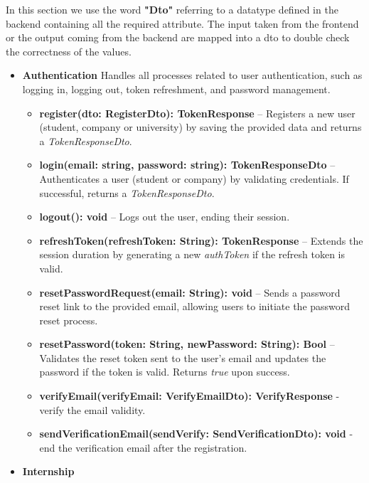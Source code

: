 In this section we use the word \textbf{"Dto"} referring to a datatype defined in the backend containing all the required attribute. The input taken from the frontend or the output coming from the backend are mapped into a dto to double check the correctness of the values.

\begin{itemize}
\item \textbf{Authentication}
Handles all processes related to user authentication, such as logging in, logging out, token refreshment, and password management.

\begin{itemize}
    \item \textbf{register(dto: RegisterDto): TokenResponse} – Registers a new user (student, company or university) by saving the provided data and returns a \textit{TokenResponseDto}.
    \item \textbf{login(email: string, password: string): TokenResponseDto} – Authenticates a user (student or company) by validating credentials. If successful, returns a \textit{TokenResponseDto}.
    \item \textbf{logout(): void} – Logs out the user, ending their session.
    \item \textbf{refreshToken(refreshToken: String): TokenResponse} – Extends the session duration by generating a new \textit{authToken} if the refresh token is valid.
    \item \textbf{resetPasswordRequest(email: String): void} – Sends a password reset link to the provided email, allowing users to initiate the password reset process.
    \item \textbf{resetPassword(token: String, newPassword: String): Bool} – Validates the reset token sent to the user's email and updates the password if the token is valid. Returns \textit{true} upon success.
    \item \textbf{verifyEmail(verifyEmail: VerifyEmailDto): VerifyResponse} - verify the email validity.
    \item \textbf{sendVerificationEmail(sendVerify: SendVerificationDto): void} - end the verification email after the registration.
\end{itemize}

\item \textbf{Internship}


\end{itemize}
